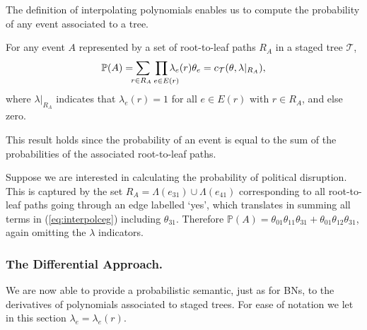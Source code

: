 {The definition of interpolating polynomials enables us to compute the probability of any event associated to a tree. 
\begin{lemma}\label{lem:darwiche}
For any event $A$ represented by a set of root-to-leaf paths $R_A$ in a staged tree $\mathcal{T}$,
\begin{equation*}\label{eq:lem1}
\mathbb{P}(A)=\sum_{\mathclap{r\in R_A~}}~\prod_{\mathclap{\quad e\in E(r)}}\lambda_e(r)\theta_e=c_\mathcal{T}(\theta,\lambda|_{R_A}),
\end{equation*}
where $\lambda|_{R_A}$ indicates that $\lambda_e(r)=1$ for all $e\in E(r)$ with $r\in R_A$, and else zero.
\end{lemma} 
This result holds since the probability of an event is equal to the sum of the probabilities of the associated root-to-leaf paths.

\begin{example}\label{bsp:lem1}
Suppose we are interested in calculating the probability of  political disruption. This is captured by the set $R_A=\Lambda(e_{31})\cup\Lambda(e_{41})$ corresponding to all root-to-leaf paths going through an edge labelled \lq{y}es', which translates in  summing all terms in (\ref{eq:interpolceg}) including $\theta_{31}$. Therefore $\mathbb{P}(A)=\theta_{01}\theta_{11}\theta_{31}+\theta_{01}\theta_{12}\theta_{31}$, again omitting the $\lambda$ indicators.
\end{example}

\subsubsection{The Differential Approach.}\label{sect:diff}
We are now able to provide a probabilistic semantic, just as \cite{Darwiche2003} for BNs, to the derivatives of  polynomials associated to staged trees. For ease of notation we let in this section $\lambda_e=\lambda_e(r)$.

}
